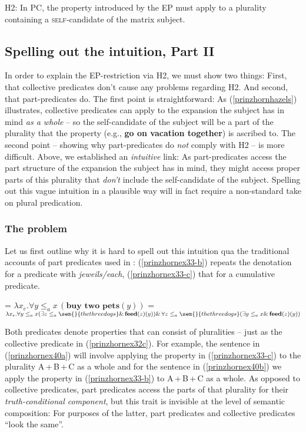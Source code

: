 \documentclass[output=paper]{langscibook}
\begin{document}
\ea H2: In PC, the property introduced by the EP must apply to a plurality containing a \textsc{self}-candidate of the matrix subject. \label{prinzhornexr2} \z


\subsection{Spelling out the intuition, Part II}\label{prinzhornsec:4.2}

In order to explain the EP-restriction via H2, we must show two things: First,  that collective predicates don't cause any problems regarding H2. And second, that part-predicates do. The first point is straightforward: As (\ref{prinzhornhazels}) illustrates, collective predicates can apply to the expansion the subject has in mind \textit{as a whole} -- so  the self-candidate of the subject will  be a part of the plurality that the property (e.g., \textbf{go on vacation together})  is ascribed to. The second point -- showing why part-predicates do \textit{not}  comply with H2 -- is more difficult. Above, we established an \textit{intuitive} link: As part-predicates access the part structure of the expansion the subject has in mind, they might access proper parts of this plurality that \textit{don't} include the self-candidate of the subject. Spelling out this vague intuition in a plausible way will in fact require a non-standard take on plural predication.


\subsubsection{The problem}

Let us first outline why it is hard to spell out this intuition qua the traditional accounts of part predicates used in : (\ref{prinzhornex33-b}) repeats the denotation for a predicate with \textit{jeweils/each}, (\ref{prinzhornex33-c}) that for a cumulative predicate.

\ea \label{prinzhornexden}
\ea {} = $\lambda x_{e}. \forall y \le_{a} x \,(\textbf{buy  two pets}(y))$\label{prinzhornex33-b}
\ex {} = $\lambda x_{e}. \forall y \le_{a} x (\exists z \le_{a} \sem{}{the three dogs} \&\, \textbf{feed}(z)(y)) \&\, \forall z \le_{a} \sem{}{the three dogs} (\exists y \le_{a} x \& \,\textbf{feed}(z)(y))$ \label{prinzhornex33-c}
\z\z

Both predicates denote properties that can consist of pluralities -- just as the collective predicate in (\ref{prinzhornex32c}). For example, the sentence in (\ref{prinzhornex40a}) will involve applying the property in (\ref{prinzhornex33-c}) to the plurality A\,+\,B\,+\,C as a whole and  for the sentence in (\ref{prinzhornex40b}) we apply the property in (\ref{prinzhornex33-b}) to A\,+\,B\,+\,C as a whole. As opposed to collective predicates, part predicates access the parts of that plurality for their \textit{truth-conditional component}, but this trait is invisible at the level of semantic composition: For purposes of the latter, part predicates and collective predicates “look the same”. 
\end{document}
